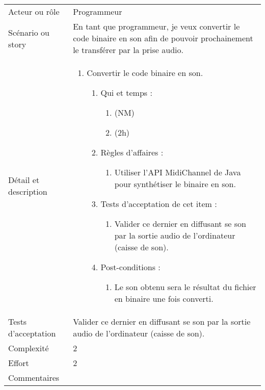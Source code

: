 \begin{longtable}{|l|p{}|}
\hline
    \rowcolor{Gray}
    \multicolumn{2}{|l|}{4} \\
\hline
    Acteur ou rôle & Programmeur \\
\hline
    Scénario ou story & En tant que programmeur, je veux convertir le code binaire en son afin de pouvoir prochainement le transférer par la prise audio. \\
\hline
    Détail et description & 
        \begin{enumerate}[label*=\arabic*.]
        \item Convertir le code binaire en son.
            \begin{enumerate}[label*=\arabic*.]
                    \item Qui et temps :
                    \begin{enumerate}[label*=\arabic*.]
                        \item (NM)
                        \item (2h)
                    \end{enumerate}
                    \item Règles d’affaires :
                    \begin{enumerate}[label*=\arabic*.]
                        \item Utiliser l'API MidiChannel de Java pour synthétiser le binaire en son.
                    \end{enumerate}
                    \item Tests d'acceptation de cet item :
                    \begin{enumerate}[label*=\arabic*.]
                        \item Valider ce dernier en diffusant se son par la sortie audio de l'ordinateur (caisse de son).
                    \end{enumerate}
                    \item Post-conditions :
                    \begin{enumerate}[label*=\arabic*.]
                        \item Le son obtenu sera le résultat du fichier en binaire une fois converti.
                    \end{enumerate}
                \end{enumerate}
        \end{enumerate} \\
\hline
    Tests d'acceptation & Valider ce dernier en diffusant se son par la sortie audio de l'ordinateur (caisse de son). \\
\hline
    Complexité & 2 \\
\hline
    Effort & 2 \\
\hline
    Commentaires &  \\


\end{longtable}
